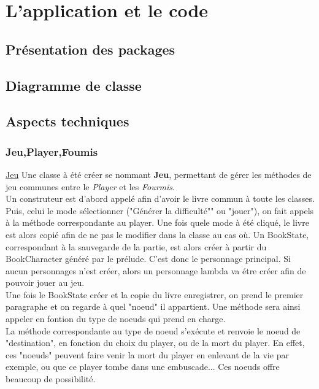 \chapter{L'application et le code}



	\section{Présentation des packages}



	\section{Diagramme de classe}



	\section{Aspects techniques}

		\subsection{Jeu,Player,Foumis}
			\headline
			\underline{Jeu}
			Une classe à été créer se nommant \textbf{Jeu}, permettant de gérer les méthodes de jeu communes entre le \textit{Player} et les \textit{Fourmis}.\\
			Un construteur est d'abord appelé afin d'avoir le livre commun à toute les classes. Puis, celui le mode sélectionner ("Générer la difficulté"" ou "jouer"), on fait appels à la méthode correspondante au player. Une fois quele mode à été cliqué, le livre est alors copié afin de ne pas le modifier dans la classe au cas où. Un BookState, correspondant à la sauvegarde de la partie, est alors créer à partir du BookCharacter généré par le prélude. C'est donc le personnage principal. Si aucun personnages n'est créer, alors un personnage lambda va étre créer afin de pouvoir jouer au jeu.\\
			Une fois le BookState créer et la copie du livre enregistrer, on prend le premier paragraphe et on regarde à quel "noeud" il appartient. Une méthode sera ainsi appeler en fontion du type de noeuds qui prend en charge.\\
			La méthode correspondante au type de noeud s'exécute et renvoie le noeud de "destination", en fonction du choix du player, ou de la mort du player. En effet, ces "noeuds" peuvent faire venir la mort du player en enlevant de la vie par exemple, ou que ce player tombe dans une embuscade... Ces noeuds offre beaucoup de possibilité.\\

